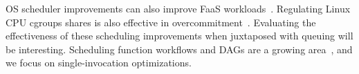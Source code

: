 OS scheduler improvements can also improve FaaS workloads~\cite{fu2022sfs}. 
Regulating Linux CPU cgroups shares is also effective in overcommitment~\cite{ensure-faas-acsos20}.
Evaluating the effectiveness of these scheduling improvements when juxtaposed with queuing will be interesting. 
Scheduling function workflows and DAGs are a growing area~\cite{shen_defuse_2021,mahgoub_wisefuse_2022,zhou_qos-aware_2022}, and we focus on single-invocation optimizations. 

\begin{comment}
Restoring from snapshots~\cite{vhive, faasnap, catalyzer}


\paragraph{Edge.}
The lower resource availability of edge platforms also motivates lighter control planes. 
Tinyfaas is a apecialized FaaS platform for the edge 
\cite{pfandzelter_tinyfaas_2020}, but uses existing control planes like OpenWhisk and Kubless.
\cite{hall_execution_2019}


\paragraph{Scheduling.}

ANY papers that use previous running time/task size information!? Atoll. Aquatope. 

Tail latency: 50ms for warm-starts for the cloud. \cite{ustiugov_analyzing_2021} 

RL scheduling~\cite{yu2021faasrank}. 

Lets trace it\cite{scheuner_lets_2022} , platform overheads etc.


Workflow and serverless DAG scheduling is complementary to \sysname. 

FnSched. Anshul \cite{}. Centralized Scheduling? 

Sharing containers in SAND \cite{akkus_sand_2018}

Hierarchical scheduling (within container) in HyperFaas. 

\paragraph{OpenWhisk.}
\cite{quevedo_evaluating_2019} evaluates the cold and warm times under OpenWhisk. 
OW Hash based scheduling described in \cite{kim_scheduling_2021}.


\end{comment}
